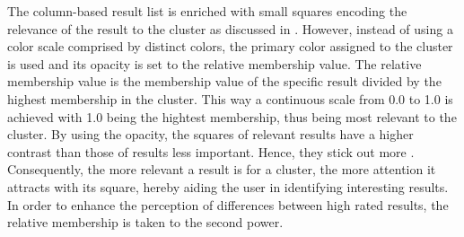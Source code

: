 The column-based result list is enriched with small squares encoding the relevance of the result to the cluster as discussed in \cite{Hoeber2006a}. However, instead of using a color scale comprised by distinct colors, the primary color assigned to the cluster is used and its opacity is set to the relative membership value. The relative membership value is the membership value of the specific result divided by the highest membership in the cluster. This way a continuous scale from 0.0 to 1.0 is achieved with 1.0 being the hightest membership, thus being most relevant to the cluster. By using the opacity, the squares of relevant results have a higher contrast than those of results less important. Hence, they stick out more \cite{Ware2004}. Consequently, the more relevant a result is for a cluster, the more attention it attracts with its square, hereby aiding the user in identifying interesting results. In order to enhance the perception of differences between high rated results, the relative membership is taken to the second power.